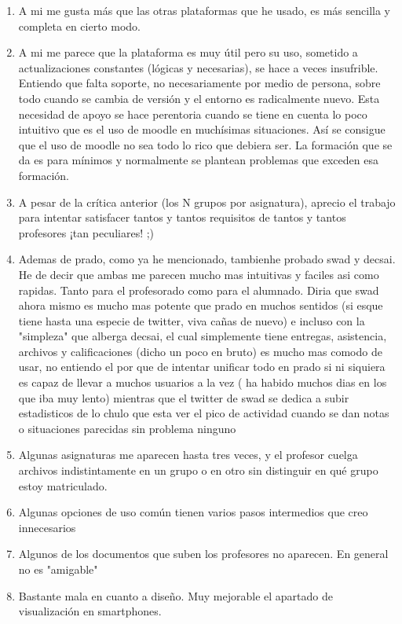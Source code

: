 \begin{enumerate}
\item A mi me gusta más que las otras plataformas que he usado, es más sencilla y completa en cierto modo.
\item A mi me parece que la plataforma es muy útil pero su uso, sometido a actualizaciones constantes (lógicas y necesarias), se hace a veces insufrible. Entiendo que falta soporte, no necesariamente por medio de persona, sobre todo cuando se cambia de versión y el entorno es radicalmente nuevo. Esta necesidad de apoyo se hace perentoria cuando se tiene en cuenta lo poco intuitivo que es el uso de moodle en muchísimas situaciones. Así se consigue que el uso de moodle no sea todo lo rico que debiera ser. La formación que se da es para mínimos y normalmente se plantean problemas que exceden esa formación.
\item A pesar de la crítica anterior (los N grupos por asignatura), aprecio el trabajo para intentar satisfacer tantos y tantos requisitos de tantos y tantos profesores ¡tan peculiares! ;)
\item Ademas de prado, como ya he mencionado, tambienhe probado swad y decsai. He de decir que ambas me parecen mucho mas intuitivas y faciles asi como rapidas. Tanto para el profesorado como para el alumnado. Diria que swad ahora mismo es mucho mas potente que prado en muchos sentidos (si esque tiene hasta una especie de twitter, viva cañas de nuevo) e incluso con la "simpleza" que alberga decsai, el cual simplemente tiene entregas, asistencia, archivos y calificaciones (dicho un poco en bruto) es mucho mas comodo de usar, no entiendo el por que de intentar unificar todo en prado si ni siquiera es capaz de llevar a muchos usuarios a la vez ( ha habido muchos dias en los que iba muy lento) mientras que el twitter de swad se dedica a subir estadisticos de lo chulo que esta ver el pico de actividad cuando se dan notas o situaciones parecidas sin problema ninguno
\item Algunas asignaturas me aparecen hasta tres veces, y el profesor cuelga archivos indistintamente en un grupo o en otro sin distinguir en qué grupo estoy matriculado.
\item Algunas opciones de uso común tienen varios pasos intermedios que creo innecesarios
\item Algunos de los documentos que suben los profesores no aparecen. En general no es "amigable"
\item Bastante mala en cuanto a diseño. Muy mejorable el apartado de visualización en smartphones.

\end{enumerate}
